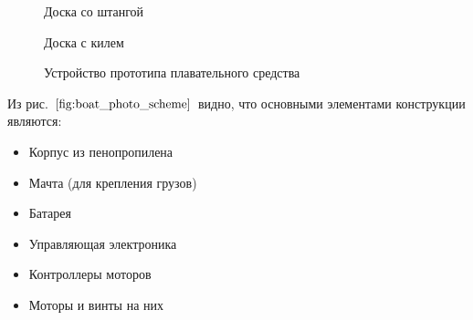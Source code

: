 \documentclass[a4paper]{article}
\begin{document}
\begin{figure}[h!]
	\caption{Доска со штангой}
	\label{fig:shtanga}
\end{figure}

\begin{figure}[h!]
	\caption{Доска с килем}
	\label{fig:kil}
\end{figure}

\begin{figure}[h!]
	\caption{Устройство прототипа плавательного средства}
	\label{fig:boat_photo_scheme}
\end{figure}

Из рис. $\ref{fig:boat_photo_scheme}$ видно, что основными элементами конструкции являются:
\begin{itemize}
	\item Корпус из пенопропилена
	\item Мачта (для крепления грузов)
	\item Батарея
	\item Управляющая электроника
	\item Контроллеры моторов
	\item Моторы и винты на них
\end{itemize}
\end{document}

